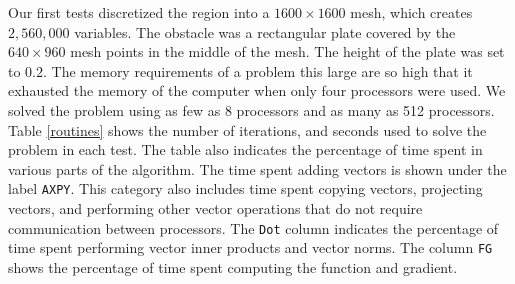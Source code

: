 Our first tests discretized the region into a $1600 \times 1600$ mesh,
which creates $2,560,000$ variables.  The obstacle was a rectangular
plate covered by the $640 \times 960$ mesh points in the middle of the
mesh.  The height of the plate was set to $0.2$.
The memory requirements of a problem
this large are so high that it exhausted the memory of the computer
when only four processors were used.  We solved the problem using as
few as 8 processors and as many as 512 processors.
Table 
\ref{routines} shows the number of iterations,
and seconds used to solve the problem in each test.
The table also indicates the
percentage of time spent in various parts of the algorithm.  The
time spent adding vectors is shown under the label {\tt AXPY}.
This category also includes time spent
copying vectors, projecting vectors, and performing other vector operations 
that do not require communication between processors.  The
{\tt Dot} column indicates the percentage of time spent performing vector
inner products and vector norms.  The column {\tt FG} shows the
percentage of time spent computing the function and gradient.

